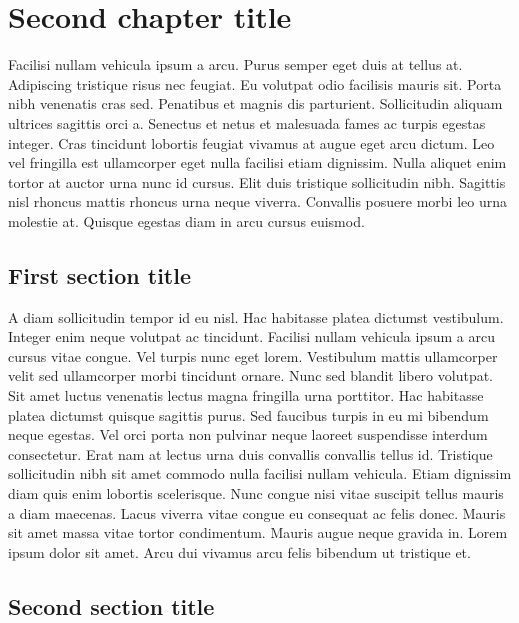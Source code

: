 \chapter{Second chapter title}
Facilisi nullam vehicula ipsum a arcu. Purus semper eget duis at tellus at. Adipiscing tristique risus nec feugiat. Eu volutpat odio 
facilisis mauris sit. Porta nibh venenatis cras sed. Penatibus et magnis dis parturient. Sollicitudin aliquam ultrices sagittis orci a. 
Senectus et netus et malesuada fames ac turpis egestas integer. Cras tincidunt lobortis feugiat vivamus at augue eget arcu dictum. Leo 
vel fringilla est ullamcorper eget nulla facilisi etiam dignissim. Nulla aliquet enim tortor at auctor urna nunc id cursus. Elit duis 
tristique sollicitudin nibh. Sagittis nisl rhoncus mattis rhoncus urna neque viverra. Convallis posuere morbi leo urna molestie at. 
Quisque egestas diam in arcu cursus euismod.

\section{First section title}

A diam sollicitudin tempor id eu nisl. Hac habitasse platea dictumst vestibulum. Integer enim neque volutpat ac tincidunt. Facilisi 
nullam vehicula ipsum a arcu cursus vitae congue. Vel turpis nunc eget lorem. Vestibulum mattis ullamcorper velit sed ullamcorper morbi 
tincidunt ornare. Nunc sed blandit libero volutpat. Sit amet luctus venenatis lectus magna fringilla urna porttitor. Hac habitasse platea 
dictumst quisque sagittis purus. Sed faucibus turpis in eu mi bibendum neque egestas. Vel orci porta non pulvinar neque laoreet suspendisse 
interdum consectetur. Erat nam at lectus urna duis convallis convallis tellus id. Tristique sollicitudin nibh sit amet commodo nulla 
facilisi nullam vehicula. Etiam dignissim diam quis enim lobortis scelerisque. Nunc congue nisi vitae suscipit tellus mauris a diam 
maecenas. Lacus viverra vitae congue eu consequat ac felis donec. Mauris sit amet massa vitae tortor condimentum. Mauris augue neque 
gravida in. Lorem ipsum dolor sit amet. Arcu dui vivamus arcu felis bibendum ut tristique et.

\section{Second section title}

